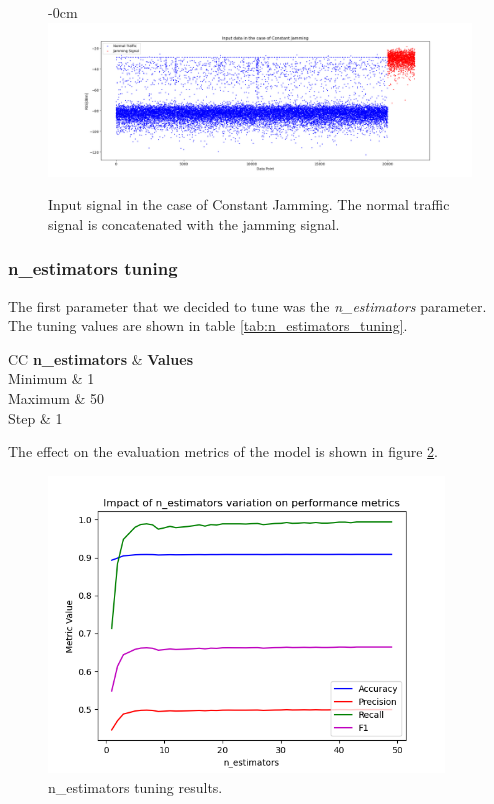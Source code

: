\documentclass[futureinternet,article,submit,pdftex,moreauthors]{Definitions/mdpi}
\begin{document}
\begin{figure}[H]
	\begin{adjustwidth}{-\extralength}{0cm}
	\centering
	\includegraphics[width=19.5cm]{img/InputSignal.png}
	\caption{Input signal in the case of Constant Jamming. The normal traffic signal is concatenated with the jamming signal.}\label{fig:InputSignal}
\end{adjustwidth}
\end{figure}  

\subsubsection{n\_estimators tuning}

The first parameter that we decided to tune was the \textit{n\_estimators} parameter. The tuning values are shown in table \ref{tab:n_estimators_tuning}.

\begin{table}[H]
	\caption{n\_estimators tuning values.}\label{tab:n_estimators_tuning}
	\begin{tabularx}{\textwidth}{CC}
	\toprule
	\textbf{n\_estimators} & \textbf{Values} \\
	\midrule
	Minimum & 1 \\
	Maximum & 50 \\
	Step & 1 \\
	\bottomrule
\end{tabularx}
\end{table}

The effect on the evaluation metrics of the model is shown in figure \ref{fig:n_estimators_tuning}.

\begin{figure}[H]
	\includegraphics[width=10.5cm]{img/nEstimatorsTuning.png}
	\caption{n\_estimators tuning results.}\label{fig:n_estimators_tuning}
\end{figure}
\unskip
\end{document}
